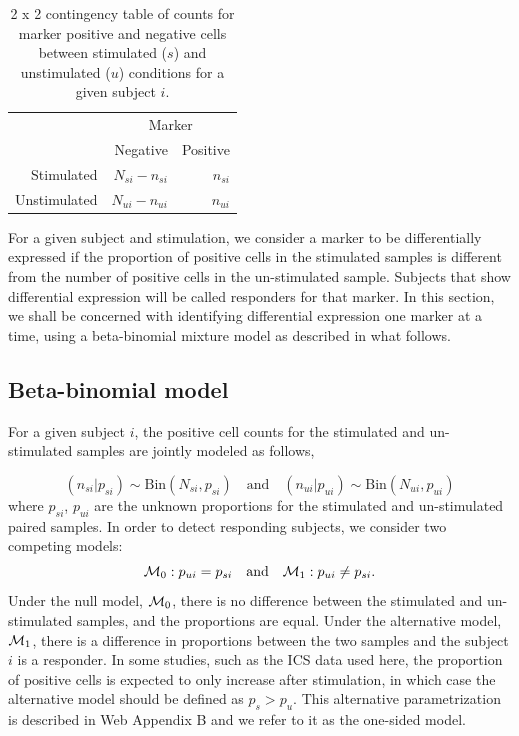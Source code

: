 \documentclass[useAMS,referee,usenatbib]{biom}
\begin{document}
\begin{table}
\centering
\parbox{0.8\linewidth}{
\caption{2 x 2 contingency table of counts for marker positive and negative cells between stimulated ($s$) and unstimulated ($u$) conditions for a given subject $i$.}\label{tab:twobytwo}
\centering
\begin{tabular}{rrr}

  \hline
\multicolumn{1}{l}{}&
\multicolumn{2}{c}{Marker}\\
 & Negative & Positive \\ 
  \hline
Stimulated &   $N_{si} - n_{si}$ &   $n_{si}$ \\ 
Unstimulated &   $N_{ui}-n_{ui}$ &   $n_{ui}$ \\ 
   \hline
\end{tabular}
}
\end{table}

For a given subject and stimulation, we consider a marker to be differentially expressed if the proportion of positive cells in the stimulated samples is different from the number of positive cells in the un-stimulated sample. Subjects that show differential expression will be called responders for that marker. In this section, we shall be concerned with identifying differential expression one marker at a time, using a beta-binomial mixture model as described in what follows. 

\subsection{Beta-binomial model}
\label{s:DE}
For a given subject $i$, the positive cell counts for the stimulated and un-stimulated samples are jointly modeled as follows,

\begin{equation*}
(n_{si}|p_{si}) \sim \mathrm{Bin}(N_{si},p_{si})\quad \text{and}\quad (n_{ui}|p_{ui}) \sim \mathrm{Bin}(N_{ui},p_{ui})\label{eq:bino_likelihood}
\end{equation*}
where $p_{si}$, $p_{ui}$ are the unknown proportions for the stimulated and un-stimulated paired samples. In order to detect responding subjects, we consider two competing models:
\begin{equation*}
{\cal M}_0: p_{ui}=p_{si}\quad \text{and}\quad {\cal M}_1: p_{ui}\ne p_{si}. \label{eq:models}
\end{equation*}
Under the null model, ${\cal M}_0$, there is no difference between the stimulated and un-stimulated samples, and the proportions are equal. Under the alternative model, ${\cal M}_1$, there is a difference in proportions between the two samples and the subject $i$ is a responder. In some studies, such as the ICS data used here, the proportion of positive cells is expected to only increase after stimulation, in which case the alternative model should be defined as $p_s>p_u$. This alternative parametrization is described in Web Appendix B and we refer to it as the one-sided model.
\end{document}
